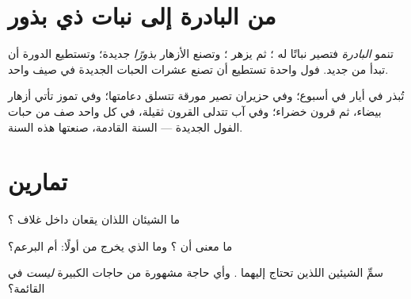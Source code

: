\section{من البادرة إلى نبات ذي بذور}

\begin{proposition}\label{prop:g2:from-seed-to-plant:cycle}
تنمو \emph{البادرة} فتصير نباتًا له  
؛ ثم يزهر ؛ وتصنع الأزهار \emph{بذورًا} جديدة؛ وتستطيع
الدورة أن تبدأ من جديد.  فول واحدة تستطيع أن تصنع عشرات
الحبات الجديدة في صيف واحد.
\end{proposition}
\admitted

\begin{example}\label{ex:g2:from-seed-to-plant:summer}
تُبذر في أيار  في أسبوع؛ وفي حزيران تصير  مورقة تتسلق
دعامتها؛ وفي تموز تأتي أزهار بيضاء، ثم قرون خضراء؛ وفي آب تتدلى
القرون ثقيلة، في كل واحد صف من حبات الفول الجديدة ---  السنة
القادمة، صنعتها  هذه السنة.
\end{example}

\section{تمارين}

\begin{exercise}[$\star$]\label{exo:g2:from-seed-to-plant:1}
ما الشيئان اللذان يقعان داخل غلاف ؟
\end{exercise}

\begin{exercise}[$\star$]\label{exo:g2:from-seed-to-plant:2}
ما معنى أن \emph{} ؟ وما الذي يخرج من  أولًا:
 أم البرعم؟
\end{exercise}

\begin{exercise}[$\star$]\label{exo:g2:from-seed-to-plant:3}
سمِّ الشيئين اللذين تحتاج إليهما  . وأي حاجة مشهورة من
حاجات  الكبيرة \emph{ليست} في القائمة؟
\end{exercise}

